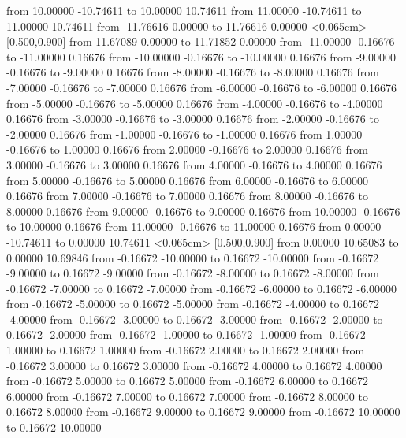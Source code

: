 \putrule from 10.00000 -10.74611 to 10.00000 10.74611
\putrule from 11.00000 -10.74611 to 11.00000 10.74611
\setsolid
\putrule from -11.76616 0.00000 to 11.76616 0.00000
\arrow <0.065cm> [0.500,0.900] from 11.67089 0.00000 to 11.71852 0.00000
\putrule from -11.00000 -0.16676 to -11.00000 0.16676
\putrule from -10.00000 -0.16676 to -10.00000 0.16676
\putrule from -9.00000 -0.16676 to -9.00000 0.16676
\putrule from -8.00000 -0.16676 to -8.00000 0.16676
\putrule from -7.00000 -0.16676 to -7.00000 0.16676
\putrule from -6.00000 -0.16676 to -6.00000 0.16676
\putrule from -5.00000 -0.16676 to -5.00000 0.16676
\putrule from -4.00000 -0.16676 to -4.00000 0.16676
\putrule from -3.00000 -0.16676 to -3.00000 0.16676
\putrule from -2.00000 -0.16676 to -2.00000 0.16676
\putrule from -1.00000 -0.16676 to -1.00000 0.16676
\putrule from 1.00000 -0.16676 to 1.00000 0.16676
\putrule from 2.00000 -0.16676 to 2.00000 0.16676
\putrule from 3.00000 -0.16676 to 3.00000 0.16676
\putrule from 4.00000 -0.16676 to 4.00000 0.16676
\putrule from 5.00000 -0.16676 to 5.00000 0.16676
\putrule from 6.00000 -0.16676 to 6.00000 0.16676
\putrule from 7.00000 -0.16676 to 7.00000 0.16676
\putrule from 8.00000 -0.16676 to 8.00000 0.16676
\putrule from 9.00000 -0.16676 to 9.00000 0.16676
\putrule from 10.00000 -0.16676 to 10.00000 0.16676
\putrule from 11.00000 -0.16676 to 11.00000 0.16676
\putrule from 0.00000 -10.74611 to 0.00000 10.74611
\arrow <0.065cm> [0.500,0.900] from 0.00000 10.65083 to 0.00000 10.69846
\putrule from -0.16672 -10.00000 to 0.16672 -10.00000
\putrule from -0.16672 -9.00000 to 0.16672 -9.00000
\putrule from -0.16672 -8.00000 to 0.16672 -8.00000
\putrule from -0.16672 -7.00000 to 0.16672 -7.00000
\putrule from -0.16672 -6.00000 to 0.16672 -6.00000
\putrule from -0.16672 -5.00000 to 0.16672 -5.00000
\putrule from -0.16672 -4.00000 to 0.16672 -4.00000
\putrule from -0.16672 -3.00000 to 0.16672 -3.00000
\putrule from -0.16672 -2.00000 to 0.16672 -2.00000
\putrule from -0.16672 -1.00000 to 0.16672 -1.00000
\putrule from -0.16672 1.00000 to 0.16672 1.00000
\putrule from -0.16672 2.00000 to 0.16672 2.00000
\putrule from -0.16672 3.00000 to 0.16672 3.00000
\putrule from -0.16672 4.00000 to 0.16672 4.00000
\putrule from -0.16672 5.00000 to 0.16672 5.00000
\putrule from -0.16672 6.00000 to 0.16672 6.00000
\putrule from -0.16672 7.00000 to 0.16672 7.00000
\putrule from -0.16672 8.00000 to 0.16672 8.00000
\putrule from -0.16672 9.00000 to 0.16672 9.00000
\putrule from -0.16672 10.00000 to 0.16672 10.00000
